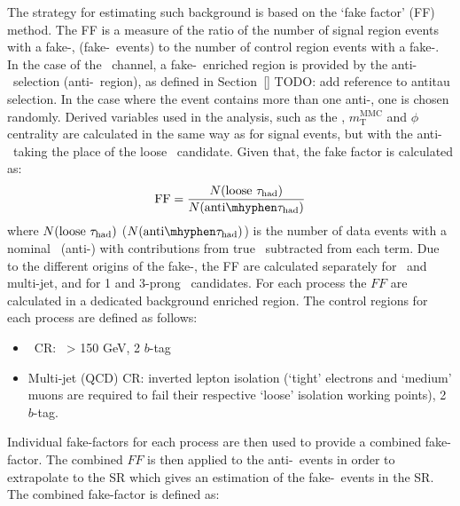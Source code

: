 The strategy for estimating such background is based on the `fake factor' (FF) method.
The FF is a measure of the ratio of the number of signal region events with a fake-\tauhad, 
(fake-\tauhad\ events)
to the number of control region events with a fake-\tauhad.
In the case of the \bbtautau\ channel, a fake-\tauhad\ enriched region is provided by the
anti-\tauhad\ selection (anti-\tauhad\ region),   
as defined in Section~\ref{} TODO: add reference to antitau selection.
In the case where the event contains more than one anti-\tauhad, 
one is chosen randomly. Derived variables used in the analysis,
such as the \MET, $m^{\mathrm{MMC}}_\mathrm{T}$ and \MET$\phi$ centrality 
are calculated in the same way as for signal events, 
but with the anti-\tauhad\ taking the place of the loose \tauhad\ candidate.
Given that, the fake factor is calculated as:
\begin{equation}
	\mathrm{FF} =  \frac{N(\text{loose }\tauhad)}{N(\mathrm{anti}\mhyphen\tauhad)} 
\end{equation} 
where $N(\text{loose }\tau_{\mathrm{had}})$ ($N(\mathrm{anti}\mhyphen\tauhad)$) is the number of 
data events with a nominal \tauhad\ (anti-\tauhad) with 
contributions from true \tauhad\ subtracted from each term.
Due to the different origins of the fake-\tauhad, the FF are
calculated separately for \ttbar\ and multi-jet, and for 1 and 3-prong \tauhad\ candidates.
For each process the $FF$ are calculated in a dedicated background enriched region. 
The control regions for each process are defined as follows:
 \begin{itemize}
	\item \ttbar\ CR: \mbb\ > 150 GeV, 2 $b$-tag 
 	\item Multi-jet (QCD) CR: inverted lepton isolation 
	 (`tight' electrons and `medium' muons are 
	 required to fail their respective `loose' isolation working points), 
	 2 $b$-tag. 
 \end{itemize}



 Individual fake-factors for each process
 are then used to provide a combined fake-factor. 
 The combined $FF$ is then applied to the anti-\tauhad\ events 
 in order to extrapolate to the SR which gives an estimation
 of the fake-\tauhad\ events in the SR.
 The combined fake-factor is defined as:
 
